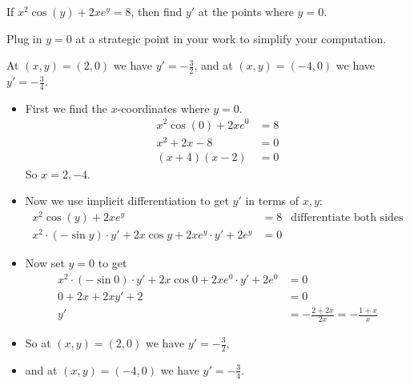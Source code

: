 \begin{question}[2015Q]
If $x^2\cos(y)+2xe^y = 8$, then find $y'$ at the points where $y=0$.
\end{question}
\begin{hint} Plug in $y = 0$ at a strategic point in your work to
        simplify your computation.
       \end{hint}
\begin{answer}
At $(x,y)=(2,0)$ we have $y' = -\frac{3}{2}$,
 and at $(x,y)=(-4,0)$ we have $y' = -\frac{3}{4}$.
\end{answer}
\begin{solution}
\begin{itemize}
 \item First we find the $x$-coordinates where $y=0$.
\begin{align*}
  x^2\cos(0)+2xe^0 &= 8 \\
  x^2 +2x - 8 &=0\\
  (x+4)(x-2)&=0
\end{align*}
So $x=2,-4$.
\item Now we use implicit differentiation to get $y'$ in terms of $x,y$:
\begin{align*}
  x^2\cos(y)+2xe^y &= 8 & \text{differentiate both sides} \\
  x^2 \cdot (-\sin y) \cdot y' + 2x \cos y + 2xe^y \cdot y' + 2e^y &= 0
\end{align*}
\item Now set $y=0$ to get
\begin{align*}
  x^2 \cdot (-\sin 0) \cdot y' + 2x \cos 0 + 2xe^0 \cdot y' + 2e^0 &= 0  \\
  0 + 2x + 2xy' + 2 &=0 \\
  y' &= - \frac{2+2x}{2x} = -\frac{1+x}{x}
\end{align*}
\item So at $(x,y)=(2,0)$ we have $y' = -\frac{3}{2}$,
\item and at $(x,y)=(-4,0)$ we have $y' = -\frac{3}{4}$.
\end{itemize}
\end{solution}


